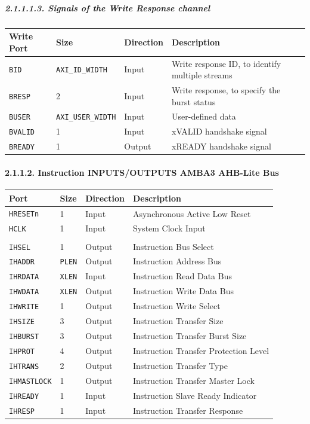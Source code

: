 \documentclass[
]{article}
\begin{document}
\hypertarget{signals-of-the-write-response-channel-2}{%
\subparagraph{2.1.1.1.3. Signals of the Write Response
channel}\label{signals-of-the-write-response-channel-2}}

\begin{longtable}[]{@{}llll@{}}
\toprule
Write Port & Size & Direction & Description\tabularnewline
\midrule
\endhead
\texttt{BID} & \texttt{AXI\_ID\_WIDTH} & Input & Write response ID, to
identify multiple streams\tabularnewline
\texttt{BRESP} & 2 & Input & Write response, to specify the burst
status\tabularnewline
\texttt{BUSER} & \texttt{AXI\_USER\_WIDTH} & Input & User-defined
data\tabularnewline
\texttt{BVALID} & 1 & Input & xVALID handshake signal\tabularnewline
\texttt{BREADY} & 1 & Output & xREADY handshake signal\tabularnewline
\bottomrule
\end{longtable}

\hypertarget{instruction-inputsoutputs-amba3-ahb-lite-bus-1}{%
\paragraph{2.1.1.2. Instruction INPUTS/OUTPUTS AMBA3 AHB-Lite
Bus}\label{instruction-inputsoutputs-amba3-ahb-lite-bus-1}}

\begin{longtable}[]{@{}llll@{}}
\toprule
Port & Size & Direction & Description\tabularnewline
\midrule
\endhead
\texttt{HRESETn} & 1 & Input & Asynchronous Active Low
Reset\tabularnewline
\texttt{HCLK} & 1 & Input & System Clock Input\tabularnewline
& & &\tabularnewline
\texttt{IHSEL} & 1 & Output & Instruction Bus Select\tabularnewline
\texttt{IHADDR} & \texttt{PLEN} & Output & Instruction Address
Bus\tabularnewline
\texttt{IHRDATA} & \texttt{XLEN} & Input & Instruction Read Data
Bus\tabularnewline
\texttt{IHWDATA} & \texttt{XLEN} & Output & Instruction Write Data
Bus\tabularnewline
\texttt{IHWRITE} & 1 & Output & Instruction Write Select\tabularnewline
\texttt{IHSIZE} & 3 & Output & Instruction Transfer Size\tabularnewline
\texttt{IHBURST} & 3 & Output & Instruction Transfer Burst
Size\tabularnewline
\texttt{IHPROT} & 4 & Output & Instruction Transfer Protection
Level\tabularnewline
\texttt{IHTRANS} & 2 & Output & Instruction Transfer Type\tabularnewline
\texttt{IHMASTLOCK} & 1 & Output & Instruction Transfer Master
Lock\tabularnewline
\texttt{IHREADY} & 1 & Input & Instruction Slave Ready
Indicator\tabularnewline
\texttt{IHRESP} & 1 & Input & Instruction Transfer
Response\tabularnewline
\bottomrule
\end{longtable}
\end{document}
